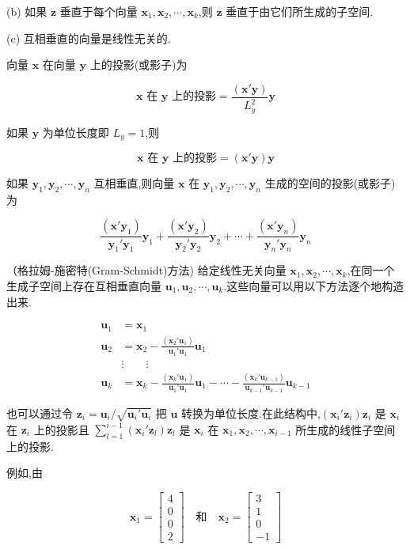 
(b) 如果 $\bm{z}$ 垂直于每个向量 $\bm{x}_1 ,\bm{x}_2 ,\cdots ,\bm{x}_k$,则 $\bm{z}$ 垂直于由它们所生成的子空间.

(c) 互相垂直的向量是线性无关的.

 \quad 向量 $\bm{x}$ 在向量 $\bm{y}$ 上的投影(或影子)为

\[
\text{$\bm{x}$ 在 $\bm{y}$ 上的投影} = \frac{(\bm{x}'\bm{y})}{L_y^2} \bm{y}
\]

如果 $\bm{y}$ 为单位长度即 $L_y = 1$,则

\[
\text{$\bm{x}$ 在 $\bm{y}$ 上的投影} = (\bm{x}'\bm{y}) \bm{y}
\]

如果 $\bm{y}_1 ,\bm{y}_2 ,\cdots ,\bm{y}_n$ 互相垂直,则向量 $\bm{x}$ 在 $\bm{y}_1 ,\bm{y}_2 ,\cdots ,\bm{y}_n$ 生成的空间的投影(或影子)为

\[
\frac{(\bm{x}'\bm{y}_1)}{\bm{y}_1'\bm{y}_1} \bm{y}_1 + \frac{(\bm{x}'\bm{y}_2)}{\bm{y}_2'\bm{y}_2} \bm{y}_2 + \cdots + \frac{(\bm{x}'\bm{y}_n)}{\bm{y}_n'\bm{y}_n} \bm{y}_n
\]

 （格拉姆-施密特(Gram-Schmidt)方法) \quad 给定线性无关向量 $\bm{x}_1 ,\bm{x}_2 ,\cdots ,\bm{x}_k$,在同一个生成子空间上存在互相垂直向量 $\bm{u}_1 ,\bm{u}_2 ,\cdots ,\bm{u}_k$.这些向量可以用以下方法逐个地构造出来.

\begin{align*}
\bm{u}_1 &= \bm{x}_1 \\
\bm{u}_2 &= \bm{x}_2 - \frac{(\bm{x}_2'\bm{u}_1)}{\bm{u}_1'\bm{u}_1} \bm{u}_1 \\
&\vdots \qquad \vdots \\
\bm{u}_k &= \bm{x}_k - \frac{(\bm{x}_k'\bm{u}_1)}{\bm{u}_1'\bm{u}_1} \bm{u}_1 - \cdots - \frac{(\bm{x}_k'\bm{u}_{k-1})}{\bm{u}_{k-1}'\bm{u}_{k-1}} \bm{u}_{k-1}
\end{align*}

也可以通过令 $\bm{z}_i = \bm{u}_i / \sqrt{\bm{u}_i'\bm{u}_i}$ 把 $\bm{u}$ 转换为单位长度.在此结构中,$(\bm{x}_i'\bm{z}_i)\bm{z}_i$ 是 $\bm{x}_i$ 在 $\bm{z}_i$ 上的投影且 $\sum\limits_{l=1}^{i-1} (\bm{x}_i'\bm{z}_l)\bm{z}_l$ 是 $\bm{x}_i$ 在 $\bm{x}_1 ,\bm{x}_2 ,\cdots ,\bm{x}_{i-1}$ 所生成的线性子空间上的投影.

例如,由

\[
\bm{x}_1 = \begin{bmatrix} 4 \\ 0 \\ 0 \\ 2 \end{bmatrix} \quad \text{和} \quad
\bm{x}_2 = \begin{bmatrix} 3 \\ 1 \\ 0 \\ -1 \end{bmatrix}
\]

